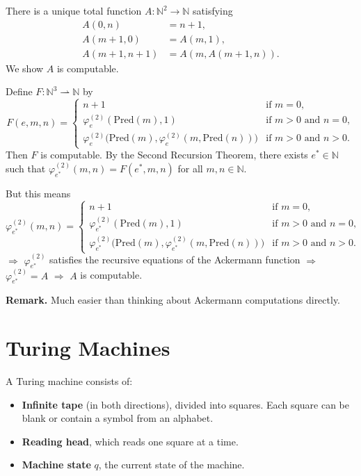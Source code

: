 \documentclass[11pt]{article}
\begin{document}
There is a unique total function $A\colon \mathbb{N}^2 \to \mathbb{N}$ satisfying
\begin{align*}
    A(0, n) &= n + 1, \\
    A(m+1, 0) &= A(m, 1), \\
    A(m+1, n+1) &= A(m, A(m+1, n)).
\end{align*}
We show $A$ is computable.

Define $F\colon \mathbb{N}^3 \rightharpoonup \mathbb{N}$ by
\[
    F(e, m, n) = \begin{cases}
        n + 1 & \text{if } m = 0, \\
        \varphi_e^{(2)}(\mathrm{Pred}(m), 1) & \text{if } m > 0 \text{ and } n = 0, \\
        \varphi_e^{(2)}\bigl(\mathrm{Pred}(m), \varphi_e^{(2)}(m, \mathrm{Pred}(n))\bigr) & \text{if } m > 0 \text{ and } n > 0.
    \end{cases}
\]
Then $F$ is computable. By the Second Recursion Theorem, there exists $e^* \in \mathbb{N}$ such that $\varphi_{e^*}^{(2)}(m, n) = F(e^*, m, n)$ for all $m, n \in \mathbb{N}$.


But this means
\[
    \varphi_{e^*}^{(2)}(m, n) = \begin{cases}
        n + 1 & \text{if } m = 0, \\
        \varphi_{e^*}^{(2)}(\mathrm{Pred}(m), 1) & \text{if } m > 0 \text{ and } n = 0, \\
        \varphi_{e^*}^{(2)}\bigl(\mathrm{Pred}(m), \varphi_{e^*}^{(2)}(m, \mathrm{Pred}(n))\bigr) & \text{if } m > 0 \text{ and } n > 0.
    \end{cases}
\]
$\Rightarrow$ $\varphi_{e^*}^{(2)}$ satisfies the recursive equations of the Ackermann function $\Rightarrow$ $\varphi_{e^*}^{(2)} = A$ $\Rightarrow$ $A$ is computable.

\textbf{Remark.} Much easier than thinking about Ackermann computations directly.

\newpage

\section{Turing Machines}

A Turing machine consists of:
\begin{itemize}[leftmargin=1.6em]
    \item \textbf{Infinite tape} (in both directions), divided into squares. Each square can be blank or contain a symbol from an alphabet.
    \item \textbf{Reading head}, which reads one square at a time.
    \item \textbf{Machine state} $q$, the current state of the machine.
\end{itemize}
\end{document}
